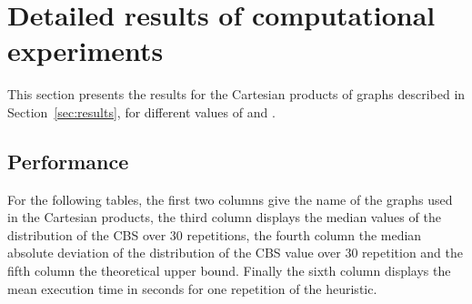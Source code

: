 \documentclass{scrartcl}
\theoremstyle{plain}
\newcommand{\cbs}{CBS}
\begin{document}
\section{Detailed results of computational experiments}
\label{sec:detailed_results}

This section presents the results for the Cartesian products of graphs described 
in Section~\ref{sec:results}, for different values of  and . 



\subsection{Performance}

For the following tables, the first two columns give the name of the graphs 
used in the Cartesian products, the third column displays the median values of 
the distribution of the \cbs{} over 30 repetitions, the fourth column the 
median absolute deviation of the distribution of the \cbs{} value over 30 
repetition and the fifth column the theoretical upper bound. Finally the sixth 
column displays the mean execution time in seconds for one repetition of the 
heuristic.
\end{document}
